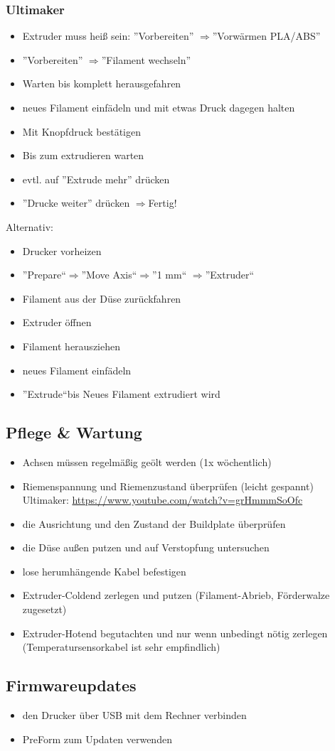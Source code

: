 \documentclass{\basedir/fablab-document}
\newcommand{\ra}{$\Rightarrow$}
\begin{document}
	\subsubsection{Ultimaker}
	\begin{itemize}
		\item Extruder muss heiß sein: ''Vorbereiten'' \ra ''Vorwärmen PLA/ABS''
		\item ''Vorbereiten'' \ra ''Filament wechseln''
		\item Warten bis komplett herausgefahren
		\item neues Filament einfädeln und mit etwas Druck dagegen halten
		\item Mit Knopfdruck bestätigen
		\item Bis zum extrudieren warten
		\item evtl. auf ''Extrude mehr''  drücken
		\item ''Drucke weiter'' drücken \ra Fertig!
	\end{itemize}
	Alternativ:
	\begin{itemize}
		\item Drucker vorheizen
		\item ''Prepare``\ra ''Move Axis``\ra ''1 mm`` \ra ''Extruder``
		\item Filament aus der Düse zurückfahren
		\item Extruder öffnen
		\item Filament herausziehen
		\item neues Filament einfädeln
		\item ''Extrude``bis Neues Filament extrudiert wird
	\end{itemize}
	
	\subsection{Pflege \& Wartung}
	
	\begin{itemize}
		\item Achsen müssen regelmäßig geölt werden (1x wöchentlich)
		\item Riemenspannung und Riemenzustand überprüfen (leicht gespannt)\\
		Ultimaker: \url{https://www.youtube.com/watch?v=grHmmmSoOfc}
		\item die Ausrichtung und den Zustand der Buildplate überprüfen
		\item die Düse außen putzen und auf Verstopfung untersuchen
		\item lose herumhängende Kabel befestigen
		\item Extruder-Coldend zerlegen und putzen (Filament-Abrieb, Förderwalze zugesetzt)
		\item Extruder-Hotend begutachten und nur wenn unbedingt nötig zerlegen (Temperatursensorkabel ist sehr empfindlich)
	\end{itemize}
	
	\subsection{Firmwareupdates}
	
	\begin{itemize}
		\item den Drucker über USB mit dem Rechner verbinden
		\item PreForm zum Updaten verwenden
	\end{itemize}
	
\end{document}
